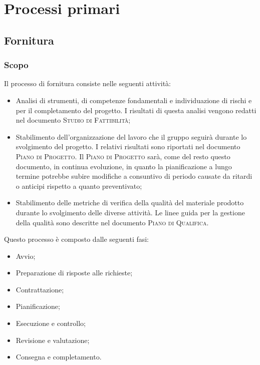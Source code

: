 \section{Processi primari}
\label{sec:processi_primari}

\subsection{Fornitura}

\subsubsection{Scopo}

Il processo di fornitura consiste nelle seguenti attività:
\begin{itemize}
    \item Analisi di strumenti, di competenze fondamentali e individuazione di rischi e  per il 
    completamento del progetto. I risultati di questa analisi vengono redatti nel documento 
    \textsc{Studio di Fattibilità};
    \item Stabilimento dell'organizzazione del lavoro che il gruppo seguirà durante lo svolgimento del progetto. 
    I relativi risultati sono riportati nel documento \textsc{Piano di Progetto}. 
    Il \textsc{Piano di Progetto} sarà, come del resto questo documento, in continua evoluzione, in quanto la 
    pianificazione a lungo termine potrebbe subire modifiche a consuntivo di periodo causate da ritardi o anticipi 
    rispetto a quanto preventivato;
    \item Stabilimento delle metriche di verifica della qualità del materiale prodotto durante lo svolgimento delle 
    diverse attività. Le linee guida per la gestione della qualità sono descritte nel documento 
    \textsc{Piano di Qualifica}.
\end{itemize}
Questo processo è composto dalle seguenti fasi:
\begin{itemize}
    \item Avvio;
    \item Preparazione di risposte alle richieste;
    \item Contrattazione;
    \item Pianificazione;
    \item Esecuzione e controllo;
    \item Revisione e valutazione;
    \item Consegna e completamento.
\end{itemize}

